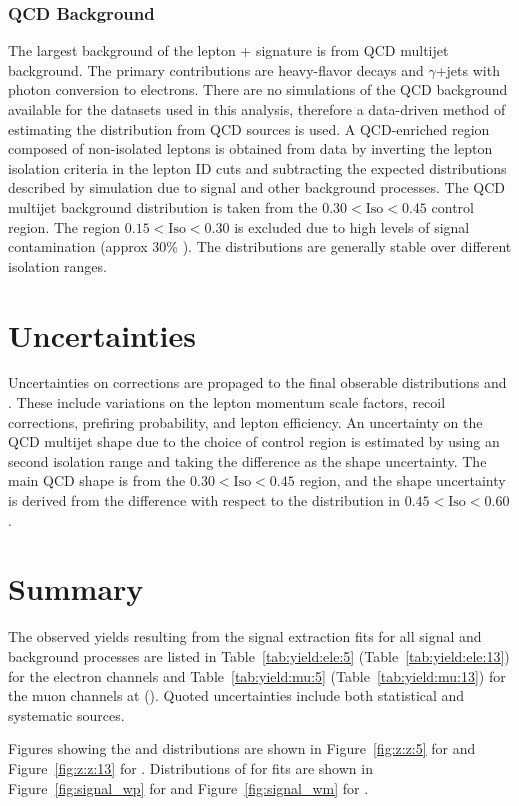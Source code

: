 \subsubsection{QCD Background}\label{ch:w:qcd}
The largest background of the \wlnu lepton + \met signature is from QCD multijet background. The primary contributions are heavy-flavor decays and $\gamma$+jets with photon conversion to electrons. 
There are no simulations of the QCD background available for the datasets used in this analysis, therefore a data-driven method of estimating the \mt distribution from QCD sources is used. A QCD-enriched region composed of non-isolated leptons is obtained from data by inverting the lepton isolation criteria in the lepton ID cuts and subtracting the expected \mt distributions described by simulation due to \W signal and other background processes. The QCD multijet background \mt distribution is taken from the $0.30 < \mathrm{Iso} < 0.45$ control region. The region $0.15 < \mathrm{Iso} < 0.30$ is excluded due to high levels of \W signal contamination (approx 30\% \W). The \mt distributions are generally stable over different isolation ranges.


\section{Uncertainties}\label{ch:unc}
Uncertainties on corrections are propaged to the final obserable distributions \mt and \mll. These include variations on the lepton momentum scale factors, recoil corrections, prefiring probability, and lepton efficiency.
An uncertainty on the QCD multijet shape due to the choice of control region is estimated by using an second isolation range and taking the difference as the shape uncertainty. The main QCD \mt shape is from the $0.30 < \mathrm{Iso} < 0.45$ region, and the shape uncertainty is derived from the difference with respect to the \mt distribution in $0.45 < \mathrm{Iso} < 0.60$.

\section{Summary}

The observed yields resulting from the signal extraction fits for all signal and background processes are listed in Table~\ref{tab:yield:ele:5} (Table~\ref{tab:yield:ele:13}) for the electron channels and Table~\ref{tab:yield:mu:5} (Table~\ref{tab:yield:mu:13}) for the muon channels at \serag (\serah). Quoted uncertainties include both statistical and systematic sources.

Figures showing the \Zmm and \Zee \mll distributions are shown in Figure~\ref{fig:z:z:5} for \serag and Figure~\ref{fig:z:z:13} for \serah. Distributions of \mt for \W fits are shown in Figure~\ref{fig:signal_wp} for \Wp and Figure~\ref{fig:signal_wm} for \Wm.

 







